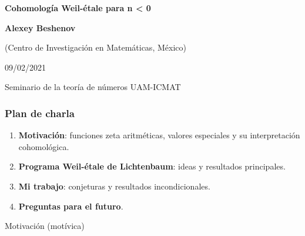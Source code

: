 \documentclass[handout]{beamer}
\begin{document}

\begin{frame}[noframenumbering]
  \begin{center}
    {\LARGE\bf Cohomología Weil-étale para n < 0

    }

    \vspace{3em}

    {\large\bf Alexey Beshenov}

    \vspace{1em}

    {\small (Centro de Investigación en Matemáticas, México)}

    \vspace{3em}

    09/02/2021

    \vspace{1em}

    Seminario de la teoría de números UAM-ICMAT

  \end{center}
\end{frame}


\begin{frame}
  \frametitle{Plan de charla}

  \begin{enumerate}
  \item<2-> \textbf{Motivación}:
    funciones zeta aritméticas,
    valores especiales
    y su interpretación cohomológica.

  \item<3-> \textbf{Programa Weil-étale de Lichtenbaum}:
    ideas y resultados principales.

  \item<4-> \textbf{Mi trabajo}:
    conjeturas y resultados incondicionales.

  \item<5-> \textbf{Preguntas para el futuro}.
  \end{enumerate}
\end{frame}


\begin{frame}[plain]
  \headingfont

  \begin{center}
    {\huge Motivación (motívica)}
  \end{center}
\end{frame}
\end{document}
